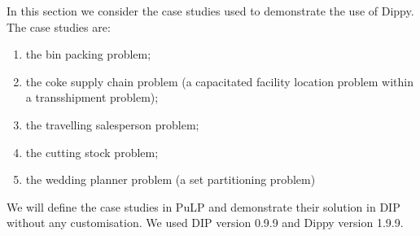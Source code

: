 In this section we consider the case studies used to demonstrate the use of Dippy. The case studies are:
\begin{enumerate}
\item the bin packing problem;
\item the coke supply chain problem (a capacitated facility location problem within a transshipment problem);
\item the travelling salesperson problem;
\item the cutting stock problem;
\item the wedding planner problem (a set partitioning problem)
\end{enumerate}

We will define the case studies in PuLP and demonstrate their solution in \ac{DIP} without any customisation. We used \ac{DIP} version 0.9.9 and Dippy version 1.9.9.









